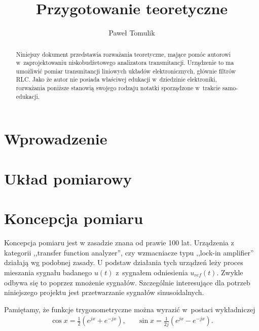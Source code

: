 \documentclass[paper=a4,DIV=12]{tfa}
\begin{document}
\title{Przygotowanie teoretyczne}
\author{Paweł Tomulik}
\date{}
\maketitle

\begin{abstract}
  Niniejszy dokument przedstawia rozważania teoretyczne, mające pomóc autorowi
  w~zaprojektowaniu niskobudżetowego analizatora transmitancji. Urządzenie to
  ma umożliwić pomiar transmitancji liniowych układów elektronicznych, głównie
  filtrów RLC. Jako że autor nie posiada właściwej edukacji w~dziedzinie
  elektroniki, rozważania poniższe stanowią swojego rodzaju notatki sporządzone
  w~trakcie samo-edukacji.
\end{abstract}

\section{Wprowadzenie}
\label{sec:G1J9K}

\section{Układ pomiarowy}
\label{sec:NMQFB}

\section{Koncepcja pomiaru}
\label{sec:6C4QN}

Koncepcja pomiaru jest w zasadzie znana od prawie 100 lat. Urządzenia z
kategorii ,,transfer function analyzer'', czy wzmacniacze typu ,,lock-in
amplifier'' działają wg podobnej zasady. U podstaw działania tych urządzeń leży
proces mieszania sygnału badanego $u(t)$ z~sygnałem odniesienia $u_{ref}(t)$.
Zwykle odbywa się to poprzez mnożenie sygnałów. Szczególnie interesujące dla
potrzeb niniejszego projektu jest przetwarzanie sygnałów sinusoidalnych.

Pamiętamy, że funkcje trygonometryczne można wyrazić w~postaci wykładniczej
\begin{align}
  & \cos x = \frac{1}{2} \left( e^{jx} + e^{-jx}\right), &
  & \sin x = \frac{1}{2j} \left( e^{jx} - e^{-jx}\right). &
  \label{eq:7R2OT}
\end{align}
\end{document}
